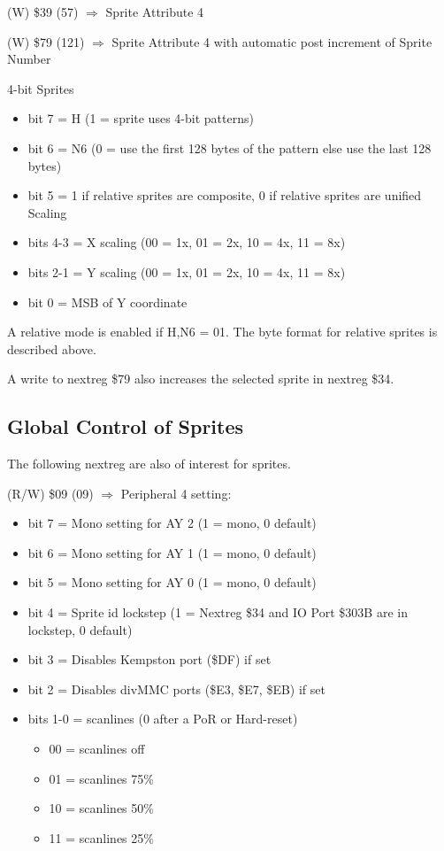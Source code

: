 (W) \$39 (57) $\Rightarrow$ Sprite Attribute 4

(W) \$79 (121) $\Rightarrow$ Sprite Attribute 4 with automatic post
increment of Sprite Number

4-bit Sprites
\begin{itemize}
\item[] bit 7 = H (1 = sprite uses 4-bit patterns)
\item[] bit 6 = N6 (0 = use the first 128 bytes of the pattern else
  use the last 128 bytes)
\item[] bit 5 = 1 if relative sprites are composite, 0 if relative
  sprites are unified Scaling
\item[] bits 4-3 = X scaling (00 = 1x, 01 = 2x, 10 = 4x, 11 = 8x)
\item[] bits 2-1 = Y scaling (00 = 1x, 01 = 2x, 10 = 4x, 11 = 8x)
\item[] bit 0 = MSB of Y coordinate
\end{itemize}
A relative mode is enabled if H,N6 = 01. The byte format for relative
sprites is described above.

A write to nextreg \$79 also increases the selected sprite in nextreg
\$34.

\subsection{Global Control of Sprites}

The following nextreg are also of interest for sprites.

(R/W) \$09 (09) $\Rightarrow$ Peripheral 4 setting:
\begin{itemize}
\item[] bit 7 = Mono setting for AY 2 (1 = mono, 0 default)
\item[] bit 6 = Mono setting for AY 1 (1 = mono, 0 default)
\item[] bit 5 = Mono setting for AY 0 (1 = mono, 0 default)
\item[] bit 4 = Sprite id lockstep (1 = Nextreg \$34 and IO Port
  \$303B are in lockstep, 0 default)
\item[] bit 3 = Disables Kempston port (\$DF) if set
\item[] bit 2 = Disables divMMC ports (\$E3, \$E7, \$EB) if set
\item[] bits 1-0 = scanlines (0 after a PoR or Hard-reset)
  \begin{itemize}
  \item[] 00 = scanlines off
  \item[] 01 = scanlines 75\%
  \item[] 10 = scanlines 50\%
  \item[] 11 = scanlines 25\%
  \end{itemize}
\end{itemize}

